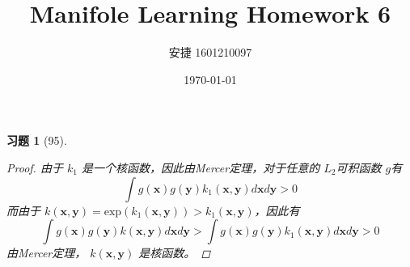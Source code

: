 \documentclass[a4paper, UTF8]{ctexart}
\title{Manifole Learning Homework 6}
\date{\today}
\author{安捷 1601210097}
\newtheorem*{exercise}{\textbf{习题}}
\begin{document}
\maketitle
  \begin{exercise}[95]
    \begin{proof}
      由于 $k_1$ 是一个核函数，因此由Mercer定理，对于任意的 $L_2$可积函数 $g$有
      \begin{equation}
        \int g \left( \mathbf{x} \right) g \left(  \mathbf{y}\right)k_1 \left( \mathbf{x}, \mathbf{y} \right) d \mathbf{x} d \mathbf{y} > 0
      \end{equation}
      而由于 $k \left( \mathbf{x}, \mathbf{y} \right) = \mathrm{exp}\left( k_1 \left( \mathbf{x}, \mathbf{y} \right) \right) > k_1 \left( \mathbf{x}, \mathbf{y} \right)$，因此有
      \begin{equation}
        \int g \left( \mathbf{x} \right) g \left( \mathbf{y} \right) k \left( \mathbf{x}, \mathbf{y} \right) d \mathbf{x} d \mathbf{y} > \int g \left( \mathbf{x} \right) g \left( \mathbf{y} \right) k_1 \left( \mathbf{x}, \mathbf{y} \right) d \mathbf{x} d \mathbf{y} > 0
      \end{equation}
      由Mercer定理， $k \left( \mathbf{x}, \mathbf{y} \right)$ 是核函数。
    \end{proof}
  \end{exercise}
\end{document}
